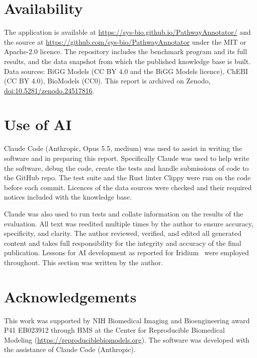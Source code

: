 \documentclass[10pt]{article}
\begin{document}
\section{Availability}
The application is available at \url{https://sys-bio.github.io/PathwayAnnotator/} and the source at
\url{https://github.com/sys-bio/PathwayAnnotator} under the MIT or Apache-2.0 licence. The repository
includes the benchmark program and its full results, and the data snapshot from which the published
knowledge base is built. Data sources: BiGG Models (CC BY 4.0 and the BiGG Models licence), ChEBI (CC BY 4.0),
BioModels (CC0). This report is archived on Zenodo, \href{https://doi.org/10.5281/zenodo.24517816}{doi:10.5281/zenodo.24517816}.

\section*{Use of AI}

Claude Code (Anthropic, Opus 5.5, medium) was used to assist in writing the software and in preparing this report. Specifically Claude was used to help write the software, debug the code, create the tests and handle submissions of code to the GitHub repo. The test suite and the Rust linter Clippy were run on the code before each commit. Licences of the data sources were checked and their required notices included with the knowledge base.

Claude was also used to run tests and collate information on the results of the evaluation. All text was reedited multiple times by the author to ensure accuracy, specificity, and clarity. The author reviewed, verified, and edited all generated content and takes full responsibility for the integrity and accuracy of the final publication. Lessons for AI development as reported for Iridium~\cite{iridium2026} were employed throughout. This section was written by the author.

\section*{Acknowledgements}
This work was supported by NIH Biomedical Imaging and Bioengineering award P41 EB023912 through HMS at the
Center for Reproducible Biomedical Modeling (\url{https://reproduciblebiomodels.org}). The software was
developed with the assistance of Claude Code (Anthropic).

{\small


}

\appendix
\end{document}
